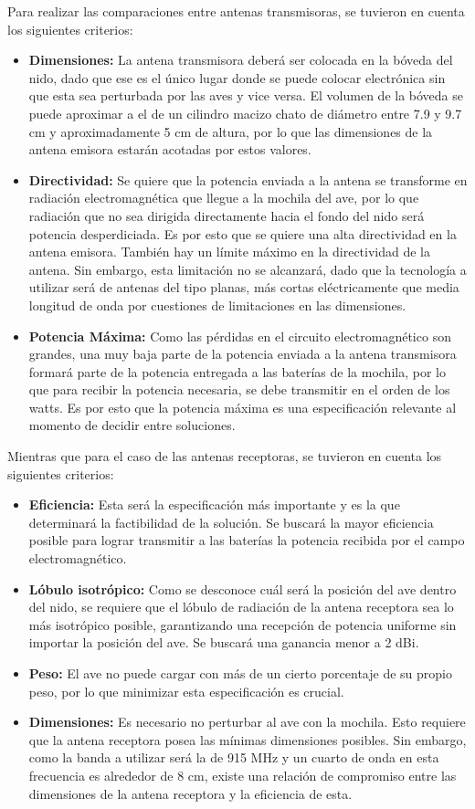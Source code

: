 Para realizar las comparaciones entre antenas transmisoras, se tuvieron en cuenta los siguientes criterios:
\begin{itemize}
\item \textbf{Dimensiones:} La antena transmisora deberá ser colocada en la bóveda del nido, dado que ese es el único lugar donde se puede colocar electrónica sin que esta sea perturbada por las aves y vice versa. El volumen de la bóveda se puede aproximar a el de un cilindro macizo chato de diámetro entre 7.9 y 9.7 cm y aproximadamente 5 cm de altura, por lo que las dimensiones de la antena emisora estarán acotadas por estos valores.
\item \textbf{Directividad:} Se quiere que la potencia enviada a la antena se transforme en radiación electromagnética que llegue a la mochila del ave, por lo que radiación que no sea dirigida directamente hacia el fondo del nido será potencia desperdiciada. Es por esto que se quiere una alta directividad en la antena emisora. También hay un límite máximo en la directividad de la antena. Sin embargo, esta limitación no se alcanzará, dado que la tecnología a utilizar será de antenas del tipo planas, más cortas eléctricamente que media longitud de onda por cuestiones de limitaciones en las dimensiones. 
\item \textbf{Potencia Máxima:} Como las pérdidas en el circuito electromagnético son grandes, una muy baja parte de la potencia enviada a la antena transmisora formará parte de la potencia entregada a las baterías de la mochila, por lo que para recibir la potencia necesaria, se debe transmitir en el orden de los watts. Es por esto que la potencia máxima es una especificación relevante al momento de decidir entre soluciones.
\end{itemize}

Mientras que para el caso de las antenas receptoras, se tuvieron en cuenta los siguientes criterios:
\begin{itemize}
\item \textbf{Eficiencia:} Esta será la especificación más importante y es la que determinará la factibilidad de la solución. Se buscará la mayor eficiencia posible para lograr transmitir a las baterías la potencia recibida por el campo electromagnético.
\item \textbf{Lóbulo isotrópico:} Como se desconoce cuál será la posición del ave dentro del nido, se requiere que el lóbulo de radiación de la antena receptora sea lo más isotrópico posible, garantizando una recepción de potencia uniforme sin importar la posición del ave. Se buscará una ganancia menor a 2 dBi.
\item \textbf{Peso:} El ave no puede cargar con más de un cierto porcentaje de su propio peso, por lo que minimizar esta especificación es crucial.
\item \textbf{Dimensiones:} Es necesario no perturbar al ave con la mochila. Esto requiere que la antena receptora posea las mínimas dimensiones posibles. Sin embargo, como la banda a utilizar será la de 915 MHz y un cuarto de onda en esta frecuencia es alrededor de 8 cm, existe una relación de compromiso entre las dimensiones de la antena receptora y la eficiencia de esta.
\end{itemize}


